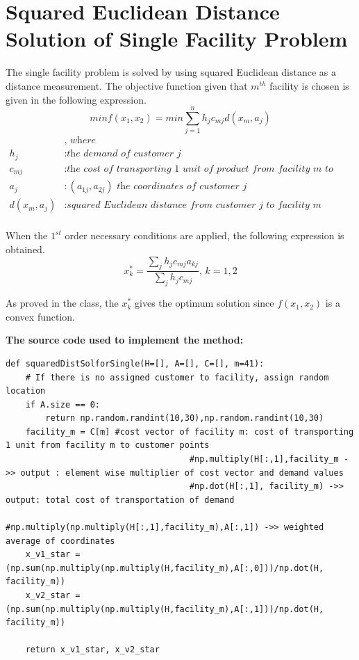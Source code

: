 \documentclass[12pt]{article}
\begin{document}
\section{Squared Euclidean Distance Solution of Single Facility Problem}
The single facility problem is solved by using squared Euclidean distance as a distance measurement. The objective function given that $m^{th}$ facility is chosen is given in the following expression.
\begin{equation} 
    min f(x_1,x_2)=min \sum_{j=1}^{n}h_jc_{mj}d(x_m,a_j)
\end{equation}
\begin{equation*}
    \begin{split}
    &\textit{, where }\\
        h_j &: \textit{the demand of customer j} \\
        c_{mj} &: \textit{the cost of transporting 1 unit of product from facility m to customer j per unit distance}\\
        a_j &: (a_{1j} , a_{2j}) \textit{ the coordinates of customer j} \\
        d(x_m,a_j) &: \textit{squared Euclidean distance from customer j to facility m} \\
    \end{split}
\end{equation*}

When the $1^{st}$ order necessary conditions are applied, the following expression is obtained.
\begin{equation}
    x_k^*=\frac{\sum_jh_jc_{mj}a_{kj}}{\sum_jh_jc_{mj}} \textit{, } k=1,2
\end{equation}

As proved in the class, the $x_k^*$ gives the optimum solution since $f(x_1,x_2)$ is a convex function.

\textbf{The source code used to implement the method:}
\begin{lstlisting}[style=pythonstyle]
def squaredDistSolforSingle(H=[], A=[], C=[], m=41):
    # If there is no assigned customer to facility, assign random location
    if A.size == 0:
        return np.random.randint(10,30),np.random.randint(10,30)
    facility_m = C[m] #cost vector of facility m: cost of transporting 1 unit from facility m to customer points
                                     #np.multiply(H[:,1],facility_m ->> output : element wise multiplier of cost vector and demand values
                                     #np.dot(H[:,1], facility_m) ->> output: total cost of transportation of demand
                                     #np.multiply(np.multiply(H[:,1],facility_m),A[:,1]) ->> weighted average of coordinates   
    x_v1_star = (np.sum(np.multiply(np.multiply(H,facility_m),A[:,0]))/np.dot(H, facility_m))
    x_v2_star = (np.sum(np.multiply(np.multiply(H,facility_m),A[:,1]))/np.dot(H, facility_m))
    
    return x_v1_star, x_v2_star
\end{lstlisting}
\end{document}
